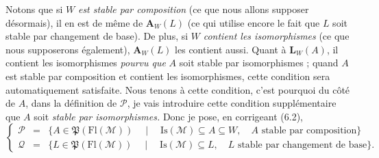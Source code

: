 \documentclass[11pt]{article}
\newcommand{\msp}[1]{\marginpar{\footnotesize [#1]}}
\newcommand{\Fl}{\mathrm{Fl}}
\newcommand{\Pf}{\mathfrak{P}}
\begin{document}
\msp{page 86}Notons que si $W$ \textit{est stable par composition} (ce que nous allons supposer désormais), il en est de même de $\mathbf{A}_W(L)$ (ce qui utilise encore le fait que $L$ soit stable par changement de base). De plus, si $W$ \textit{contient les isomorphismes} (ce que nous supposerons également), $\mathbf{A}_W(L)$ les contient aussi. Quant à $\mathbf{L}_W(A)$, il contient les isomorphismes \textit{pourvu que} $A$ soit stable par isomorphismes ; quand $A$ est stable par composition et contient les isomorphismes, cette condition sera automatiquement satisfaite. Nous tenons à cette condition, c'est pourquoi du côté de $A$, dans la définition de $\mathcal{P}$, je vais introduire cette condition supplémentaire que $A$ soit \textit{stable par isomorphismes.} Donc je pose, en corrigeant (6.2),
\[
\left\{
\begin{array}{rcl}
\mathcal{P} & = & \{A\in\Pf(\Fl(\mathcal{M}))\quad\mid\quad\mathrm{Is}(\mathcal{M})\subseteq A\subseteq W,\quad A\text{ stable par composition}\}\\[1ex]
\mathcal{Q} & = & \{L\in\Pf(\Fl(\mathcal{M}))\quad\mid\quad\mathrm{Is}(\mathcal{M})\subseteq L,\quad L\text{ stable par changement de base}\}.
\end{array}
\right.
\tag*{(6.7)}
\]
\end{document}

